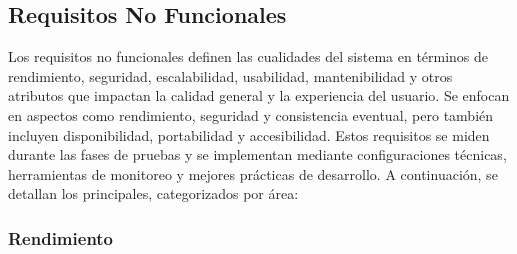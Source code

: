 \documentclass[a4paper,12pt]{article}
\begin{document}
\subsection{Requisitos No Funcionales}
Los requisitos no funcionales definen las cualidades del sistema en términos de rendimiento, seguridad, escalabilidad, usabilidad, mantenibilidad y otros atributos que impactan la calidad general y la experiencia del usuario. Se enfocan en aspectos como rendimiento, seguridad y consistencia eventual, pero también incluyen disponibilidad, portabilidad y accesibilidad. Estos requisitos se miden durante las fases de pruebas y se implementan mediante configuraciones técnicas, herramientas de monitoreo y mejores prácticas de desarrollo. A continuación, se detallan los principales, categorizados por área:

\subsubsection{Rendimiento}
\end{document}
